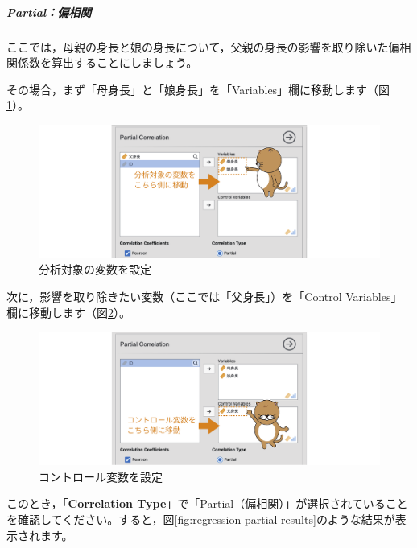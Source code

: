 \documentclass[
  12pt,
  a5jpaper,
  lualatex, ja=standard]{bxjsbook}
\begin{document}
\hypertarget{partialux504fux76f8ux95a2}{%
\subparagraph*{Partial：偏相関}\label{partialux504fux76f8ux95a2}}

ここでは，母親の身長と娘の身長について，父親の身長の影響を取り除いた偏相関係数を算出することにしましょう。

その場合，まず「母身長」と「娘身長」を「Variables」欄に移動します（図\ref{fig:regression-partial-variables}）。

\begin{figure}[!ht]

{\centering \includegraphics[width=1\linewidth]{images/regression/partial-variables} 

}

\caption{分析対象の変数を設定}\label{fig:regression-partial-variables}
\end{figure}

次に，影響を取り除きたい変数（ここでは「父身長」）を「Control Variables」欄に移動します（図\ref{fig:regression-partial-control}）。

\begin{figure}[!ht]

{\centering \includegraphics[width=1\linewidth]{images/regression/partial-control} 

}

\caption{コントロール変数を設定}\label{fig:regression-partial-control}
\end{figure}

このとき，「\textbf{Correlation Type}」で「Partial（偏相関）」が選択されていることを確認してください。すると，図\ref{fig:regression-partial-results}のような結果が表示されます。
\end{document}
